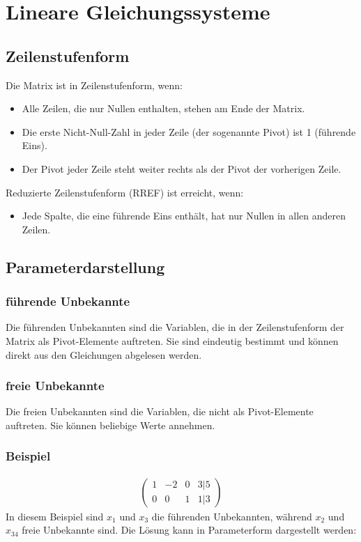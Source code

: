 \documentclass{article}
\begin{document}
\section*{Lineare Gleichungssysteme}
\begin{minipage}[t]{0.45\textwidth}
    \subsection*{Zeilenstufenform}
    Die Matrix ist in Zeilenstufenform, wenn:
    \begin{itemize}
        \item Alle Zeilen, die nur Nullen enthalten, stehen am Ende der Matrix.
        \item Die erste Nicht-Null-Zahl in jeder Zeile (der sogenannte Pivot) ist 1 (führende Eins).
        \item Der Pivot jeder Zeile steht weiter rechts als der Pivot der vorherigen Zeile.
    \end{itemize}
    Reduzierte Zeilenstufenform (RREF) ist erreicht, wenn:
    \begin{itemize}
        \item Jede Spalte, die eine führende Eins enthält, hat nur Nullen in allen anderen Zeilen.
    \end{itemize}    
\end{minipage}
\hfill
\begin{minipage}[t]{0.45\textwidth}
    \subsection*{Parameterdarstellung}
    \subsubsection*{führende Unbekannte}
    Die führenden Unbekannten sind die Variablen, die in der Zeilenstufenform der Matrix als Pivot-Elemente auftreten. Sie sind eindeutig bestimmt und können direkt aus den Gleichungen abgelesen werden.
    \subsubsection*{freie Unbekannte}
    Die freien Unbekannten sind die Variablen, die nicht als Pivot-Elemente auftreten. Sie können beliebige Werte annehmen.
    
\end{minipage}
\subsubsection*{Beispiel}
\begin{align*}
    \begin{pmatrix}
    1 & -2 & 0 & 3 | 5 \\
    0 & 0 & 1 & 1 | 3
    \end{pmatrix}
\end{align*}
In diesem Beispiel sind $x_1$ und $x_3$ die führenden Unbekannten, während $x_2$ und $x_34$ freie Unbekannte sind. Die Lösung kann in Parameterform dargestellt werden:
\end{document}
